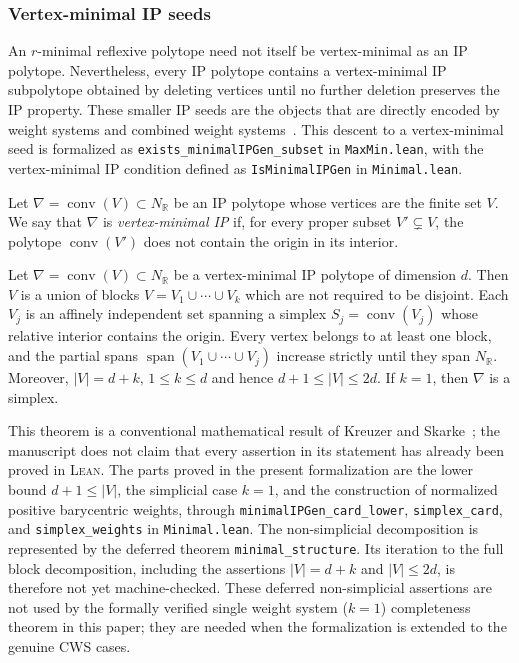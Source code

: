 \documentclass[appliedmath,article,submit,moreauthors]{Definitions/mdpi}
\newcommand{\RR}{\mathbb{R}}
\newcommand{\Lean}{\textsc{Lean}}
\newcommand{\Conv}{\operatorname{conv}}
\begin{document}
\subsubsection{Vertex-minimal IP seeds}
\label{sec:math-vmin}

An \(r\)-minimal reflexive polytope need not itself be vertex-minimal as an IP
polytope.  Nevertheless, every IP polytope contains a vertex-minimal IP
subpolytope obtained by deleting vertices until no further deletion preserves
the IP property.  These smaller IP seeds are the objects that are directly
encoded by weight systems and combined weight systems~\cite{KS97}.  This descent
to a vertex-minimal seed is formalized as
\nolinkurl{exists\_minimalIPGen\_subset} in \nolinkurl{MaxMin.lean}, with the
vertex-minimal IP condition defined as \nolinkurl{IsMinimalIPGen} in
\nolinkurl{Minimal.lean}.

\begin{Definition}
\label{def:vertex-minimal-ip}
Let \(\nabla=\Conv(V)\subset N_{\RR}\) be an IP polytope whose vertices are the
finite set \(V\).  We say that \(\nabla\) is \emph{vertex-minimal IP} if, for
every proper subset \(V'\subsetneq V\), the polytope \(\Conv(V')\) does not
contain the origin in its interior.
\end{Definition}

\begin{Theorem}
\label{thm:minstructure}
Let \(\nabla=\Conv(V)\subset N_{\RR}\) be a vertex-minimal IP polytope of
dimension \(d\).  Then \(V\) is a union of blocks $V=V_1\cup\cdots\cup V_k$
which are not required to be disjoint.  Each \(V_j\) is an affinely independent
set spanning a simplex $S_j=\Conv(V_j)$ whose relative interior contains the
origin.  Every vertex belongs to at least one block, and the partial spans
$\operatorname{span}(V_1\cup\cdots\cup V_j)$ increase strictly until they span
\(N_{\RR}\).  Moreover, $|V|=d+k,\, 1\leq k\leq d$ and hence $d+1\leq |V|\leq
2d$. If \(k=1\), then \(\nabla\) is a simplex.
\end{Theorem}

{\color{blue}
This theorem is a conventional mathematical result of Kreuzer and
Skarke~\cite{KS97}; the manuscript does not claim that every assertion in its
statement has already been proved in \Lean. The parts proved in the present
formalization are the lower bound \(d+1\leq|V|\), the simplicial case \(k=1\),
and the construction of normalized positive barycentric weights, through
\nolinkurl{minimalIPGen\_card\_lower},
\nolinkurl{simplex\_card}, and \nolinkurl{simplex\_weights} in
\nolinkurl{Minimal.lean}. The non-simplicial decomposition is represented by
the deferred theorem \nolinkurl{minimal\_structure}. Its iteration to the full
block decomposition, including the assertions \(|V|=d+k\) and
\(|V|\leq2d\), is therefore not yet machine-checked. These deferred
non-simplicial assertions are not used by the formally verified
single weight system (\(k=1\)) completeness theorem in this paper; they are
needed when the formalization is extended to the genuine CWS cases.
}
\end{document}
